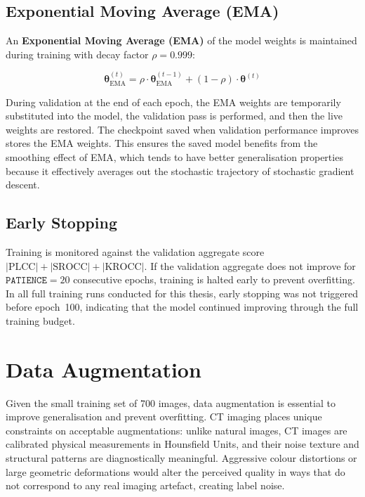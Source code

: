 \subsection{Exponential Moving Average (EMA)}

An \textbf{Exponential Moving Average (EMA)} of the model weights is maintained during
training with decay factor $\rho = 0.999$:

\begin{equation}
    \boldsymbol{\theta}_{\text{EMA}}^{(t)} = \rho \cdot \boldsymbol{\theta}_{\text{EMA}}^{(t-1)}
    + (1 - \rho) \cdot \boldsymbol{\theta}^{(t)}
    \label{eq:ema}
\end{equation}

During validation at the end of each epoch, the EMA weights are temporarily substituted
into the model, the validation pass is performed, and then the live weights are restored.
The checkpoint saved when validation performance improves stores the EMA weights.
This ensures the saved model benefits from the smoothing effect of EMA, which tends to
have better generalisation properties because it effectively averages out the stochastic
trajectory of stochastic gradient descent.

\subsection{Early Stopping}

Training is monitored against the validation aggregate score
$|\text{PLCC}| + |\text{SROCC}| + |\text{KROCC}|$. If the validation aggregate does
not improve for $\texttt{PATIENCE} = 20$ consecutive epochs, training is halted early
to prevent overfitting. In all full training runs conducted for this thesis, early
stopping was not triggered before epoch~100, indicating that the model continued
improving through the full training budget.


\section{Data Augmentation}
\label{sec:augmentation}

Given the small training set of 700 images, data augmentation is essential to improve
generalisation and prevent overfitting. CT imaging places unique constraints on
acceptable augmentations: unlike natural images, CT images are calibrated physical
measurements in Hounsfield Units, and their noise texture and structural patterns are
diagnostically meaningful. Aggressive colour distortions or large geometric deformations
would alter the perceived quality in ways that do not correspond to any real imaging
artefact, creating label noise.

